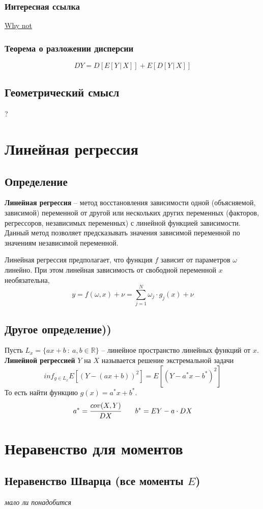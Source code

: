 \documentclass{article}
\newcommand{\R}{\mathbb{R}}
\begin{document}
\subsubsection{Интересная ссылка}
\href{https://eduardgorbunov.github.io/assets/files/Seminar07_675.pdf}{Why not}
\subsubsection{Теорема о разложении дисперсии}
$$ DY=D[E[Y\,|\,X]]+E[D[Y\,|\,X]] $$
\subsection{Геометрический смысл}
?
\newpage
\section{Линейная регрессия}
\subsection{Определение}
\textbf{Линейная регрессия} -- метод восстановления зависимости одной (объясняемой, зависимой) переменной от другой или нескольких других переменных (факторов, регрессоров, независимых переменных) с линейной функцией зависимости. Данный метод позволяет предсказывать значения зависимой переменной по значениям независимой переменной.

Линейная регрессия предполагает, что функция $f$ зависит от параметров $\omega$ линейно. При этом линейная зависимость от свободной переменной $x$ необязательна,
$$ y=f(\omega,x)+\nu=\sum_{j=1}^N \omega_j\cdot g_j(x)+\nu $$
\subsection{Другое определение))}
Пусть $L_x=\{ax+b\::\:a,b\in\R\}$ -- линейное пространство линейных функций от $x$. \textbf{Линейной регрессией} $Y$ на $X$ называется решение экстремальной задачи $$ inf_{g\in L_x} E[(Y-(ax+b))^2]=E[(Y-a^*x-b^*)^2] $$
То есть найти функцию $g(x)=a^* x+b^*$.
$$ a^*=\cfrac{cov(X,Y)}{DX} \quad\quad b^*=EY-a\cdot DX $$
\newpage
\section{Неравенство для моментов}
\subsection{Неравенство Шварца (все моменты $E$)}
\textit{мало ли понадобится}
\end{document}
